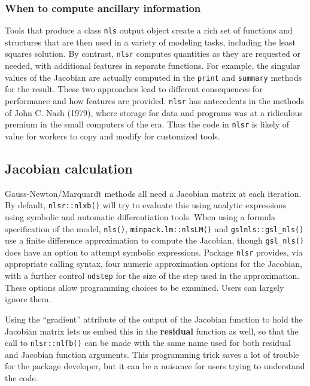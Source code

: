 \subsubsection{When to compute ancillary information}\label{when-to-compute-ancillary-information}

Tools that produce a class \texttt{nls} output object create a rich set of functions
and structures that are then used in a variety of modeling tasks, including the
least squares solution. By contrast,
\texttt{nlsr} computes quantities as they are requested or needed, with additional
features in separate functions. For example, the singular values of the Jacobian
are actually computed in the \texttt{print} and \texttt{summary} methods for the result.
These two approaches
lead to different consequences for performance and how features are
provided. \texttt{nlsr} has antecedents in the methods of John C. Nash (1979), where storage for
data and programs was at a ridiculous premium in the small computers of the era.
Thus the code in \texttt{nlsr} is likely of value for workers to copy and modify
for customized tools.

\subsection{Jacobian calculation}\label{jacobian-calculation}

Gauss-Newton/Marquardt methods all need a Jacobian matrix at each iteration.
By default, \texttt{nlsr::nlxb()} will try to evaluate this using analytic
expressions using symbolic and automatic differentiation tools.
When using a formula specification of the model, \texttt{nls()}, \texttt{minpack.lm::nlsLM()}
and \texttt{gslnls::gsl\_nls()} use a finite difference approximation to compute the
Jacobian, though \texttt{gsl\_nls()} does have an option to attempt symbolic expressions.
Package \texttt{nlsr} provides, via appropriate calling syntax, four numeric approximation
options for the Jacobian, with a further control \texttt{ndstep} for the size of the
step used in the approximation. These options allow programming choices to be
examined. Users can largely ignore them.

Using the ``gradient'' attribute of the output of the Jacobian function to hold
the Jacobian matrix lets us embed this in the \textbf{residual} function as well,
so that the call to \texttt{nlsr::nlfb()} can be made with the same name used for
both residual and Jacobian function arguments. This programming trick saves a
lot of trouble for the package developer, but it can be a nuisance for users
trying to understand the code.

